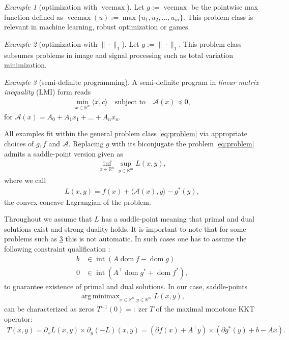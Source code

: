 \documentclass[11pt,onecolumn]{article}
\DeclareMathOperator*{\argminimax}{arg\,minimax}
\DeclareMathOperator{\vecmax}{vecmax}
\DeclareMathOperator{\dom}{dom}
\DeclareMathOperator{\intr}{int}
\DeclareMathOperator{\zer}{zer}
\newcommand{\bR}{\mathbb{R}}
\theoremstyle{remark}
\newtheorem{example}[example]{Example}
\begin{document}
\begin{example}[optimization with $\vecmax$] \label{ex:vecmax}
    Let $g:=\vecmax$ be the pointwise max function defined as $\vecmax(u):=\max\{u_1, u_2, \ldots, u_m\}$. This problem class is relevant in machine learning, robust optimization or games.
\end{example}

\begin{example}[optimization with $\|\cdot\|_1$] \label{ex:l1}
    Let $g:=\|\cdot\|_1$. This problem class subsumes problems in image and signal processing such as total variation minimization.
\end{example}

\begin{example}[semi-definite programming] \label{ex:sdp}
A semi-definite program in \emph{linear matrix inequality} (LMI) form reads
\begin{align}
\min_{x \in \bR^n} \langle x, c \rangle \quad \text{subject to}\quad \mathcal{A}(x) \preceq 0,
\end{align}
for $\mathcal{A}(x) = A_0 + A_1 x_1 + \ldots + A_n x_n$.
\end{example}
All examples fit within the general problem class \cref{eq:problem} via appropriate choices of $g,f$ and $\mathcal{A}$. Replacing $g$ with its biconjugate the problem \cref{eq:problem} admits a saddle-point version given as
\begin{align} \label{eq:saddle}
\inf_{x \in \bR^n} \sup_{y \in \bR^m} L(x,y),
\end{align}
where we call 
\begin{align} \label{eq:lagrangian}
L(x,y)=f(x) + \langle \mathcal{A}(x), y \rangle - g^*(y),
\end{align}
the convex-concave Lagrangian of the problem.

Throughout we assume that $L$ has a saddle-point meaning that primal and dual solutions exist and strong duality holds. It is important to note that for some problems such as \cref{ex:sdp} this is not automatic. In such cases one has to assume the following constraint qualification \cite[Example 11.41]{RoWe98}:
\begin{subequations}
\begin{align}
b &\in \intr (A \dom f - \dom g) \\
0 &\in \intr (A^\top \dom g^* + \dom f^*),
\end{align}
\end{subequations}
to guarantee existence of primal and dual solutions.
In our case, saddle-points
\begin{align}
\argminimax_{x\in \bR^n, y\in \bR^m} L(x,y),
\end{align}
can be characterized as zeros $T^{-1}(0) =:\zer T$ of the maximal monotone KKT operator:
\begin{align}
T(x,y) = \partial_x L(x,y) \times \partial_y (-L)(x,y) = (\partial f(x) + A^\top y )\times (\partial g^*(y) + b - Ax).
\end{align}
\end{document}
